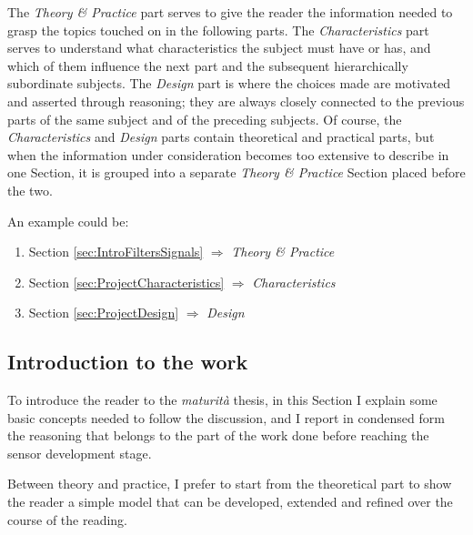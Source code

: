 \documentclass[a4paper, 10pt, final]{article} %
\begin{document}
    The \emph{Theory \& Practice} part serves to give the reader the information needed to grasp the topics touched on in the following parts.
    The \emph{Characteristics} part serves to understand what characteristics the subject must have or has, and which of them influence the next part and the subsequent hierarchically subordinate subjects.
    The \emph{Design} part is where the choices made are motivated and asserted through reasoning; they are always closely connected to the previous parts of the same subject and of the preceding subjects.
    Of course, the \emph{Characteristics} and \emph{Design} parts contain theoretical and practical parts, but when the information under consideration becomes too extensive to describe in one Section, it is grouped into a separate \emph{Theory \& Practice} Section placed before the two.
    
    \begin{samepage}
        \noindent An example could be:
        \begin{enumerate}[label=\emph{(\roman*)}]
            \item Section \ref{sec:IntroFiltersSignals} $\Rightarrow$ \emph{Theory \& Practice}
            \item Section \ref{sec:ProjectCharacteristics} $\Rightarrow$ \emph{Characteristics}
            \item Section \ref{sec:ProjectDesign} $\Rightarrow$ \emph{Design}
        \end{enumerate}
    \end{samepage}

    \subsection{Introduction to the work}\label{sec:IntroReader}
    To introduce the reader to the \emph{maturit\`{a}} thesis, in this Section I explain some basic concepts needed to follow the discussion, and I report in condensed form the reasoning that belongs to the part of the work done before reaching the sensor development stage.

    Between theory and practice, I prefer to start from the theoretical part to show the reader a simple model that can be developed, extended and refined over the course of the reading.
    
\end{document}
